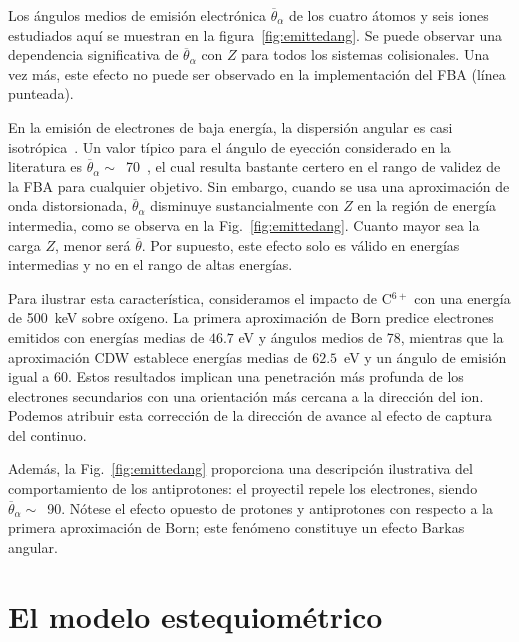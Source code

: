 Los ángulos medios de emisión electrónica $\overline{\theta}_{\alpha}$ 
de los cuatro átomos y seis iones estudiados aquí se muestran en la 
figura~\ref{fig:emittedang}. Se puede observar una dependencia 
significativa de $\overline{\theta}_{\alpha}$ con $Z$ para todos los 
sistemas colisionales. Una vez más, este efecto no puede ser observado en 
la implementación del FBA (línea punteada).

En la emisión de electrones de baja energía, la dispersión angular es 
casi isotrópica~\cite{Rudd:92}. Un valor típico para el ángulo de 
eyección considerado en la literatura es 
$\overline{\theta}_{\alpha}\sim$~70\textdegree~\cite{Surdutovic:18}, el 
cual resulta bastante certero en el rango de validez de la FBA para 
cualquier objetivo. Sin embargo, cuando se usa una aproximación de onda 
distorsionada, $\overline{\theta}_{\alpha}$ disminuye sustancialmente con 
$Z$ en la región de energía intermedia, como se observa en la 
Fig.~\ref{fig:emittedang}. Cuanto mayor sea la carga $Z$, menor será 
$\overline{\theta}$. Por supuesto, este efecto solo es válido en energías 
intermedias y no en el rango de altas energías.

Para ilustrar esta característica, consideramos el impacto de C$^{6+}$ 
con una energía de 500~keV sobre oxígeno. La primera aproximación de Born 
predice electrones emitidos con energías medias de $46.7$ eV y ángulos 
medios de 78\textdegree, mientras que la aproximación CDW establece 
energías medias de $62.5$~eV y un ángulo de emisión igual a 60\textdegree. 
Estos resultados implican una penetración más profunda de los electrones 
secundarios con una orientación más cercana a la dirección del ion. 
Podemos atribuir esta corrección de la dirección de avance al efecto de 
captura del continuo.

Además, la Fig.~\ref{fig:emittedang} proporciona una descripción 
ilustrativa del comportamiento de los antiprotones: el proyectil repele 
los electrones, siendo $\overline{\theta}_{\alpha}\sim$~90\textdegree. 
Nótese el efecto opuesto de protones y antiprotones con respecto a la 
primera aproximación de Born; este fenómeno constituye un efecto Barkas 
angular.

\section{El modelo estequiométrico}
\label{sec:SSM}

